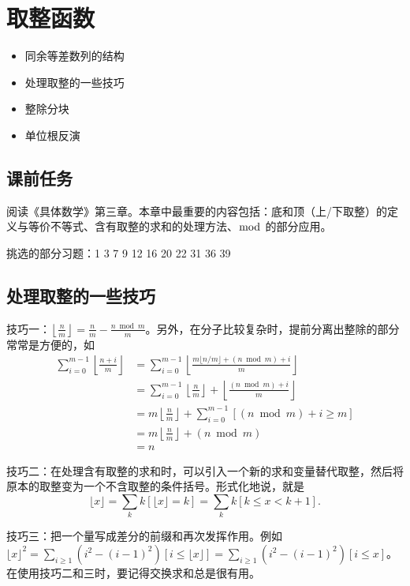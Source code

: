 \chapter{取整函数}
\begin{overview}
    \begin{itemize}
    \item 同余等差数列的结构
    \item 处理取整的一些技巧
    \item 整除分块
    \item 单位根反演
    \end{itemize}
\end{overview}
\section{课前任务}
    阅读《具体数学》第三章。本章中最重要的内容包括：底和顶（上/下取整）的定义与等价不等式、含有取整的求和的处理方法、$\bmod$ 的部分应用。
    
    挑选的部分习题：1 3 7 9 12 16 20 22 31 36 39 


\section{处理取整的一些技巧}
    技巧一：$\left\lfloor\frac{n}{m}\right\rfloor=\frac{n}{m}-\frac{n\bmod m}{m}$。另外，在分子比较复杂时，提前分离出整除的部分常常是方便的，如
    $$
    \begin{aligned}
    \sum_{i=0}^{m-1}\left\lfloor\frac{n+i}{m}\right\rfloor&=\sum_{i=0}^{m-1}\left\lfloor\frac{m\lfloor n/m\rfloor+(n\bmod m)+i}{m}\right\rfloor\\
    &=\sum_{i=0}^{m-1}\left\lfloor\frac{n}{m}\right\rfloor+\left\lfloor\frac{(n\bmod m)+i}{m}\right\rfloor\\
    &=m\left\lfloor\frac{n}{m}\right\rfloor+\sum_{i=0}^{m-1}[(n\bmod m)+i\ge m]\\
    &=m\left\lfloor\frac{n}{m}\right\rfloor+(n\bmod m)\\
    &=n
    \end{aligned}
    $$

    技巧二：在处理含有取整的求和时，可以引入一个新的求和变量替代取整，然后将原本的取整变为一个不含取整的条件括号。形式化地说，就是
    $$
    \lfloor x\rfloor=\sum_k k[\lfloor x\rfloor=k]=\sum_k k[k\le x<k+1].
    $$

    技巧三：把一个量写成差分的前缀和再次发挥作用。例如 $\lfloor x\rfloor^2=\sum_{i\ge 1}(i^2-(i-1)^2)[i\le \lfloor x\rfloor]=\sum_{i\ge 1}(i^2-(i-1)^2)[i\le x]$。在使用技巧二和三时，要记得交换求和总是很有用。

